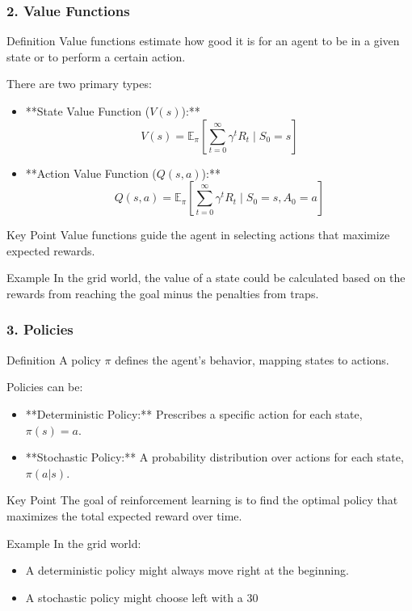 \documentclass[aspectratio=169]{beamer}
\begin{document}
\begin{frame}[fragile]
    \frametitle{2. Value Functions}
    \begin{block}{Definition}
        Value functions estimate how good it is for an agent to be in a given state or to perform a certain action.
    \end{block}
    There are two primary types:
    \begin{itemize}
        \item **State Value Function ($V(s)$):** 
        \[
        V(s) = \mathbb{E}_{\pi} \left[\sum_{t=0}^{\infty} \gamma^t R_t \mid S_0 = s\right]
        \]
        \item **Action Value Function ($Q(s, a)$):** 
        \[
        Q(s, a) = \mathbb{E}_{\pi} \left[\sum_{t=0}^{\infty} \gamma^t R_t \mid S_0 = s, A_0 = a\right]
        \]
    \end{itemize}
    \begin{block}{Key Point}
        Value functions guide the agent in selecting actions that maximize expected rewards.
    \end{block}
    \begin{block}{Example}
        In the grid world, the value of a state could be calculated based on the rewards from reaching the goal minus the penalties from traps.
    \end{block}
\end{frame}

\begin{frame}[fragile]
    \frametitle{3. Policies}
    \begin{block}{Definition}
        A policy \( \pi \) defines the agent's behavior, mapping states to actions.
    \end{block}
    Policies can be:
    \begin{itemize}
        \item **Deterministic Policy:** Prescribes a specific action for each state, \( \pi(s) = a \).
        \item **Stochastic Policy:** A probability distribution over actions for each state, \( \pi(a|s) \).
    \end{itemize}
    \begin{block}{Key Point}
        The goal of reinforcement learning is to find the optimal policy that maximizes the total expected reward over time.
    \end{block}
    \begin{block}{Example}
        In the grid world:
        \begin{itemize}
            \item A deterministic policy might always move right at the beginning.
            \item A stochastic policy might choose left with a 30%
        \end{itemize}
    \end{block}
\end{frame}
\end{document}
